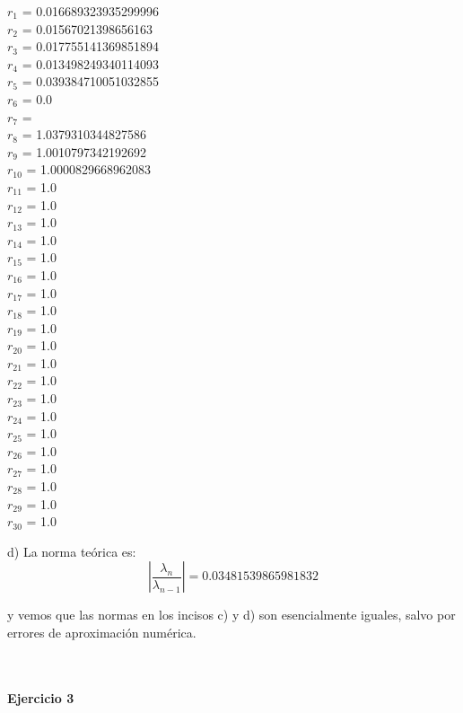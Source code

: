 \documentclass[11pt]{article}
\begin{document}
\begin{multicols}{3}
\noindent
$ r_{1} $ = 0.016689323935299996 \\
$ r_{2} $ = 0.01567021398656163 \\
$ r_{3} $ = 0.017755141369851894 \\
$ r_{4} $ = 0.013498249340114093 \\
$ r_{5} $ = 0.039384710051032855 \\
$ r_{6} $ = 0.0 \\
$ r_{7} $ =  \\
$ r_{8} $ = 1.0379310344827586 \\
$ r_{9} $ = 1.0010797342192692 \\
$ r_{10} $ = 1.0000829668962083 \\
$ r_{11} $ = 1.0 \\
$ r_{12} $ = 1.0 \\
$ r_{13} $ = 1.0 \\
$ r_{14} $ = 1.0 \\
$ r_{15} $ = 1.0 \\
$ r_{16} $ = 1.0 \\
$ r_{17} $ = 1.0 \\
$ r_{18} $ = 1.0 \\
$ r_{19} $ = 1.0 \\
$ r_{20} $ = 1.0 \\
$ r_{21} $ = 1.0 \\
$ r_{22} $ = 1.0 \\
$ r_{23} $ = 1.0 \\
$ r_{24} $ = 1.0 \\
$ r_{25} $ = 1.0 \\
$ r_{26} $ = 1.0 \\
$ r_{27} $ = 1.0 \\
$ r_{28} $ = 1.0 \\
$ r_{29} $ = 1.0 \\
$ r_{30} $ = 1.0 \\
\end{multicols}



d) La norma teórica es:
$$
\left| \frac{\lambda_n}{\lambda_{n-1}} \right| = 0.03481539865981832
$$

y vemos que las normas en los incisos c) y d) son esencialmente iguales, salvo por errores de aproximación numérica.

\noindent
\\
\\
\noindent
\textbf{Ejercicio 3}
\end{document}
